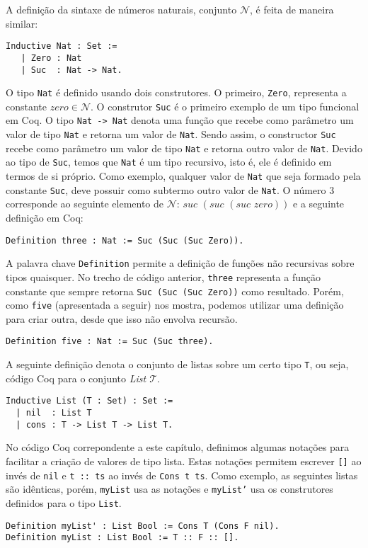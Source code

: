 A defini\c{c}\~ao da sintaxe de n\'umeros naturais, conjunto $\mathcal{N}$, \'e feita de maneira similar:
\begin{lstlisting}
Inductive Nat : Set :=
   | Zero : Nat
   | Suc  : Nat -> Nat.
\end{lstlisting}
O tipo \texttt{Nat} \'e definido usando dois construtores. O primeiro, \texttt{Zero}, representa a constante $zero\in\mathcal{N}$. O construtor
\texttt{Suc} \'e o primeiro exemplo de um tipo funcional em Coq. O tipo \texttt{Nat -> Nat} denota uma fun\c{c}\~ao que recebe como par\^ametro
um valor de tipo \texttt{Nat} e retorna um valor de \texttt{Nat}. Sendo assim, o constructor \texttt{Suc} recebe como par\^ametro um valor de
tipo \texttt{Nat} e retorna outro valor de \texttt{Nat}. Devido ao tipo de \texttt{Suc}, temos que \texttt{Nat} \'e um tipo recursivo, isto \'e,
ele \'e definido em termos de si pr\'oprio. Como exemplo, qualquer valor de \texttt{Nat} que seja formado pela constante \texttt{Suc}, deve
possuir como subtermo outro valor de \texttt{Nat}. O n\'umero $3$ corresponde
 ao seguinte elemento de $\mathcal{N}$: $suc\,\,(suc\,\,(suc\,\,zero))$ e a seguinte defini\c{c}\~ao em Coq:
\begin{lstlisting}
Definition three : Nat := Suc (Suc (Suc Zero)).
\end{lstlisting}
A palavra chave \texttt{Definition} permite a defini\c{c}\~ao de fun\c{c}\~oes n\~ao recursivas sobre tipos quaisquer. No trecho de c\'odigo
anterior, \texttt{three} representa a fun\c{c}\~ao constante que sempre retorna \texttt{Suc (Suc (Suc Zero))} como resultado.
Por\'em, como \texttt{five} (apresentada a seguir) nos mostra, podemos utilizar uma defini\c{c}\~ao para criar outra, desde que isso 
n\~ao envolva recurs\~ao.
\begin{lstlisting}
Definition five : Nat := Suc (Suc three).
\end{lstlisting}

A seguinte defini\c{c}\~ao denota o conjunto de listas sobre um certo tipo \texttt{T}, ou seja, c\'odigo Coq para o conjunto 
\textit{List $\mathcal{T}$}. 
\begin{lstlisting}
Inductive List (T : Set) : Set :=
  | nil  : List T
  | cons : T -> List T -> List T.
\end{lstlisting}
No c\'odigo Coq correpondente a este cap\'itulo, definimos algumas nota\c{c}\~oes para facilitar a cria\c{c}\~ao de valores de tipo lista.
Estas nota\c{c}\~oes permitem escrever \texttt{[]} ao inv\'es de \texttt{nil} e \texttt{t :: ts} ao inv\'es de \texttt{Cons t ts}. Como
exemplo, as seguintes listas s\~ao id\^enticas, por\'em, \texttt{myList} usa as nota\c{c}\~oes e \texttt{myList'} usa os construtores
definidos para o tipo \texttt{List}.
\begin{lstlisting}
Definition myList' : List Bool := Cons T (Cons F nil).
Definition myList : List Bool := T :: F :: [].
\end{lstlisting}

